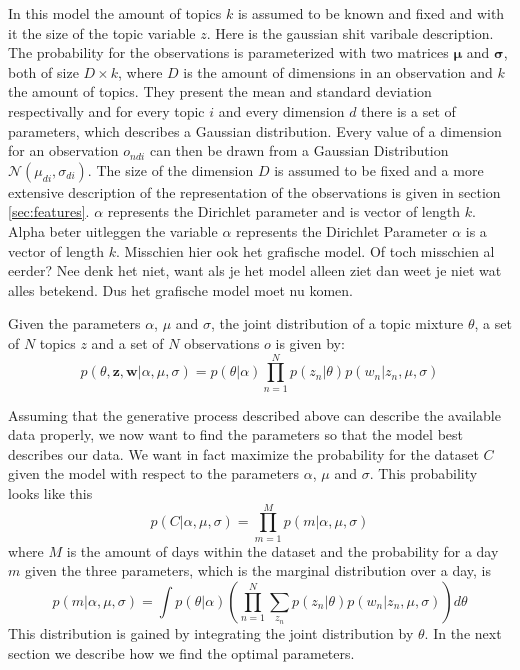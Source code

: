 \documentclass[11pt,a4paper]{article}
\begin{document}
In this model the amount of topics $k$ is assumed to be known and fixed and with it the size of the topic variable $z$.
 Here is the gaussian shit varibale description.
The probability for the observations is parameterized with two matrices $\boldsymbol\mu$ and $\boldsymbol\sigma$, both of size $D\times k$, where $D$ is the amount of dimensions in an observation and $k$ the amount of topics. They present the mean and standard deviation respectivally and for every topic $i$ and every dimension $d$ there is a set of parameters, which describes a Gaussian distribution.  Every value of a dimension for an observation $o_{ndi}$ can then be drawn from a Gaussian Distribution $\mathcal{N}(\mu_{di},\sigma_{di})$.
The size of the dimension $D$ is assumed to be fixed and a more extensive description of the representation of the observations is given in section \ref{sec:features}. $\alpha$ represents the Dirichlet parameter and is vector of length $k$.
Alpha beter uitleggen
the variable $\alpha$ represents the Dirichlet Parameter
$\alpha$ is a vector of length $k$.
Misschien hier ook het grafische model. Of toch misschien al eerder? Nee denk het niet, want als je het model alleen ziet dan weet je niet wat alles betekend. Dus het grafische model moet nu komen.

Given the parameters $\alpha$, $\mu$ and $\sigma$, the joint distribution of a topic mixture $\theta$, a set of $N$ topics $z$ and a set of $N$ observations $o$ is given by:
\begin{equation}
 p(\theta,\textbf{z},\textbf{w}|\alpha,\mu,\sigma) = p(\theta|\alpha) \prod_{n=1}^N p(z_n|\theta) p(w_n|z_n,\mu,\sigma)
\end{equation}


%
%
%

  
Assuming that the generative process described above can describe the available data properly, we now want to find the parameters so that the model best describes our data. We want in fact maximize the probability for the dataset $C$ given the model with respect to the parameters $\alpha$, $\mu$ and $\sigma$. This probability looks like this
\begin{equation}
p(C|\alpha,\mu,\sigma) = \prod_{m=1}^M p(m|\alpha,\mu,\sigma)
\end{equation}
where $M$ is the amount of days within the dataset and the probability for a day $m$ given the three parameters, which is the marginal distribution over a day, is
\begin{equation} 
p(m|\alpha,\mu,\sigma) = \int p(\theta|\alpha)  \left( \prod_{n=1}^N \sum_{z_n} p(z_n|\theta) p(w_n|z_n, \mu,\sigma)  \right) d\theta
\end{equation}
This distribution is gained by integrating the joint distribution by $\theta$.
In the next section we describe how we find the optimal parameters.
\end{document}
